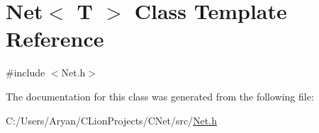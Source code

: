 \hypertarget{class_net}{}\section{Net$<$ T $>$ Class Template Reference}
\label{class_net}


{\ttfamily \#include $<$Net.\+h$>$}



The documentation for this class was generated from the following file\+:\begin{DoxyCompactItemize}
\item 
C\+:/\+Users/\+Aryan/\+C\+Lion\+Projects/\+C\+Net/src/\hyperlink{_net_8h}{Net.\+h}\end{DoxyCompactItemize}
